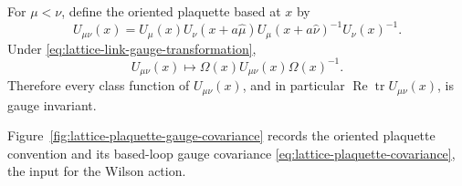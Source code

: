 For \(\mu<\nu\), define the oriented plaquette based at \(x\) by
\begin{equation}
  U_{\mu\nu}(x)
  =
  U_\mu(x)
  U_\nu(x+a\widehat\mu)
  U_\mu(x+a\widehat\nu)^{-1}
  U_\nu(x)^{-1}.
  \label{eq:lattice-plaquette-definition}
\end{equation}
Under \eqref{eq:lattice-link-gauge-transformation},
\begin{equation}
  U_{\mu\nu}(x)\longmapsto
  \Omega(x)U_{\mu\nu}(x)\Omega(x)^{-1}.
  \label{eq:lattice-plaquette-covariance}
\end{equation}
Therefore every class function of \(U_{\mu\nu}(x)\), and in particular
\(\operatorname{Re}\operatorname{tr}U_{\mu\nu}(x)\), is gauge invariant.

Figure~\ref{fig:lattice-plaquette-gauge-covariance} records the oriented
plaquette convention and its based-loop gauge covariance
\eqref{eq:lattice-plaquette-covariance}, the input for the Wilson action.

